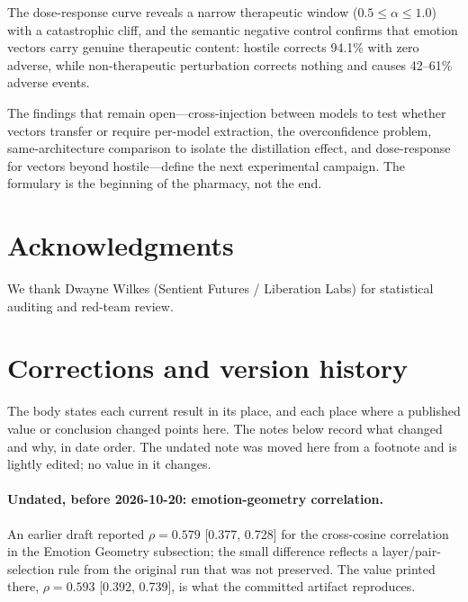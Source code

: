 \documentclass[11pt,a4paper]{article}
\begin{document}
The dose-response curve reveals a narrow therapeutic window
($0.5 \leq \alpha \leq 1.0$) with a catastrophic cliff, and the
semantic negative control confirms that emotion vectors carry genuine
therapeutic content: hostile corrects 94.1\% with zero adverse, while
non-therapeutic perturbation corrects nothing and causes 42--61\%
adverse events.

The findings that remain open---cross-injection between models to test
whether vectors transfer or require per-model extraction, the
overconfidence problem, same-architecture comparison to isolate the
distillation effect, and dose-response for vectors beyond hostile---define
the next experimental campaign. The formulary is the beginning of the
pharmacy, not the end.


\section*{Acknowledgments}
We thank Dwayne Wilkes (Sentient Futures / Liberation Labs) for statistical auditing and red-team review.

\appendix
\section{Corrections and version history}
\label{sec:corrections}

The body states each current result in its place, and each place where
a published value or conclusion changed points here. The notes below
record what changed and why, in date order. The undated note was moved
here from a footnote and is lightly edited; no value in it changes.

\paragraph{Undated, before 2026-10-20: emotion-geometry correlation.}
An earlier draft reported $\rho = 0.579$ [0.377, 0.728] for the
cross-cosine correlation in the Emotion Geometry subsection; the small
difference reflects a layer/pair-selection rule from the original run
that was not preserved. The value printed there, $\rho = 0.593$
[0.392, 0.739], is what the committed artifact reproduces.
\end{document}
